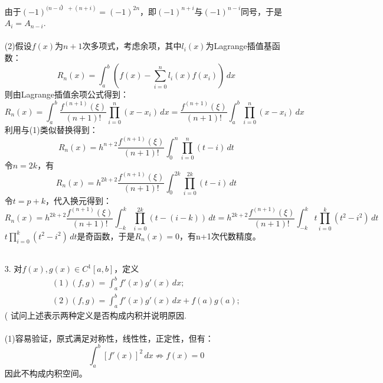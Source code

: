 \documentclass{article}
\begin{document}
\begin{itemize}
		由于$(-1)^{(n -i） +(n + i)} = (-1)^{2n} $，即$(-1)^{n+i}$与$(-1)^{n- i}$同号，于是$A_i = A_{n - i}$.\\\\
		(2)假设$f(x)$为$n+1$次多项式，考虑余项，其中$l_i(x)$为Lagrange插值基函数：
		$$R_n(x) = \int_{a}^{b}(f(x) - \sum_{i=0}^{n}l_i(x)f(x_i)) \,dx$$
		则由Lagrange插值余项公式得到：
		$$R_n(x) = \int_{a}^{b}\frac{f^{(n+1)}(\xi)}{(n+1)!}\prod_{i = 0}^{n}(x - x_i)\,dx =\frac{f^{(n+1)}(\xi)}{(n+1)!}\int_{a}^{b}\prod_{i = 0}^{n}(x - x_i)\,dx$$
		利用与(1)类似替换得到：
		$$R_n(x) =h^{n + 2}\frac{f^{(n+1)}(\xi)}{(n+1)!}\int_{0}^{n}\prod_{i = 0}^{n}(t - i)\,dt$$
		令$n = 2k$，有
		$$R_n(x) =h^{2k + 2}\frac{f^{(n+1)}(\xi)}{(n+1)!}\int_{0}^{2k}\prod_{i = 0}^{2k}(t - i)\,dt$$
		令$t = p + k$，代入换元得到：
		$$R_n(x) =h^{2k + 2}\frac{f^{(n+1)}(\xi)}{(n+1)!}\int_{-k}^{k}\prod_{i = 0}^{2k}(t  - (i - k))\,dt = h^{2k + 2}\frac{f^{(n+1)}(\xi)}{(n+1)!}\int_{-k}^{k}t\prod_{i = 0}^{k}(t^2  - i^2)\,dt$$
		$t\prod_{i = 0}^{k}(t^2  - i^2)\,dt$是奇函数，于是$R_n(x) = 0$，有n+1次代数精度。\\\\
		\item[3.]对$f(x), g(x)\in C^{1}[a, b]$，定义
		$$\begin{array}{lcl}
		(1)(f,g)=\int_{a}^{b}f'(x)g'(x)\,dx;\\
		(2)(f,g)=\int_{a}^{b}f'(x)g'(x)\,dx + f(a)g(a);
		\end{array}$$(
		试问上述表示两种定义是否构成内积并说明原因.\\\\
		(1)容易验证，原式满足对称性，线性性，正定性，但有：
		$$\int_{a}^{b}[f'(x)]^2\,dx \not\Rightarrow f(x) = 0$$
		因此不构成内积空间。\\
		

\end{itemize}
\end{document}
